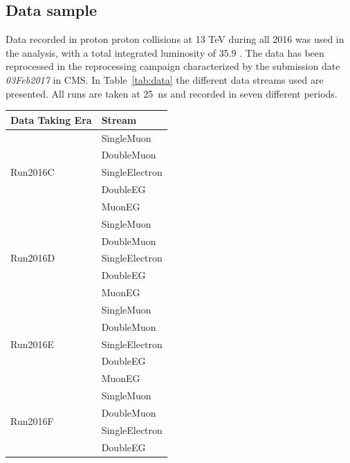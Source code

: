 \subsection*{Data sample}
Data recorded in proton proton collisions at 13 TeV during all 2016 was used in the analysis, with a total integrated luminosity of  35.9 \fbinv.
The data has been reprocessed in the reprocessing campaign characterized by the submission date \textit{03Feb2017} in CMS.
In Table~\ref{tab:data} the different data streams used are presented. All runs are taken at 25~ns and recorded in seven different periods.
\begin{table}
\begin{center}
\begin{tabular}{|l|l|}
\hline
Data Taking Era & Stream\\
\hline
\multirow{5}{*}{Run2016C} 	& SingleMuon  \\
                                & DoubleMuon \\
				& SingleElectron \\
                                & DoubleEG \\
				& MuonEG \\ \hline
\multirow{5}{*}{Run2016D}       & SingleMuon  \\
                                & DoubleMuon \\
                                & SingleElectron \\
                                & DoubleEG \\
                                & MuonEG \\ \hline
\multirow{5}{*}{Run2016E}       & SingleMuon  \\
                                & DoubleMuon \\
                                & SingleElectron \\
                                & DoubleEG \\
                                & MuonEG \\ \hline
\multirow{5}{*}{Run2016F}       & SingleMuon  \\
                                & DoubleMuon \\
                                & SingleElectron \\
                                & DoubleEG \\

\end{tabular}
\end{center}
\end{table}
